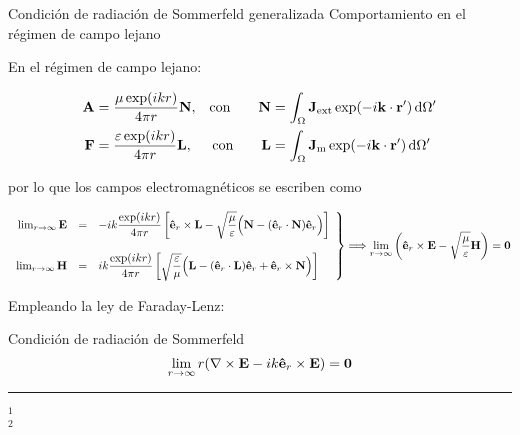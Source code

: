 \begin{frame}{Condición de radiación de Sommerfeld generalizada}
{Comportamiento en el régimen de campo lejano}\small

En el régimen de campo lejano:

\begin{align*}
    \vb{A} &= \dfrac{\mu\exp(ikr)}{4\pi r}\vb{N},         &\text{con} \qquad \vb{N} &= \int_\Omega \vb{J}_\text{ext}  \exp(-i\vb{k}\cdot\vb{r}')\dd{\Omega'}\\
    \vb{F} &= \dfrac{\varepsilon\exp(ikr)}{4\pi r}\vb{L}, &\text{con} \qquad \vb{L} &= \int_\Omega \vb{J}_\text{m}  \exp(-i\vb{k}\cdot\vb{r}')\dd{\Omega'}
\end{align*}

por lo que los campos electromagnéticos se escriben como

\begin{align*}
    \left.
    \begin{array}{rcl}
    \lim_{r\to\infty}\vb{E} &=& -i k\dfrac{\exp(ikr)}{4\pi r}
                \left[ \vu{e}_r\times\vb{L}-\sqrt{\dfrac{\mu}{\varepsilon}}  \Big(\vb{N}-(\vu{e}_r\cdot\vb{N})\vu{e}_r\Big) \right]
           \\ \\
    \lim_{r\to\infty}\vb{H} &=& i k\dfrac{\exp(ikr)}{4\pi r}
                \left[\sqrt{\dfrac{\varepsilon}{\mu}}  \Big(\vb{L}-(\vu{e}_r\cdot\vb{L})\vu{e}_r + \vu{e}_r\times\vb{N}\Big) \right]
    \end{array}
    \right\}
    \Longrightarrow\lim_{r\to\infty} \qty(\vu{e}_r\times\vb{E} - \sqrt{\dfrac{\mu}{\varepsilon}} \vb{H}) = \vb{0}
\end{align*}

Empleando la ley de Faraday-Lenz:

\begin{alertblock}{Condición de radiación de Sommerfeld}
    $$\lim_{r\to \infty} r\qty(\nabla\times \vb{E} - i k \vu{e}_r\times\vb{E}) = \vb{0}$$
\end{alertblock}%


\vspace*{1em}
	\noindent\rule{.25\textwidth}{0.4pt}
 \begin{spacing}{0}\fontsize{4}{12} \selectfont
	$^1$ \\
	$^2$ 
	\end{spacing}

\end{frame}
